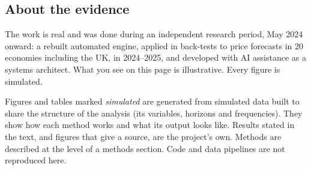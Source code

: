 \documentclass[
  british,
  a4paper,
]{article}
\begin{document}
\subsection{About the evidence}\label{about-the-evidence}

The work is real and was done during an independent research period, May
2024 onward: a rebuilt automated engine, applied in back-tests to price
forecasts in 20 economies including the UK, in 2024--2025, and developed
with AI assistance as a systems architect. What you see on this page is
illustrative. Every figure is simulated.

Figures and tables marked \emph{simulated} are generated from simulated
data built to share the structure of the analysis (its variables,
horizons and frequencies). They show how each method works and what its
output looks like. Results stated in the text, and figures that give a
source, are the project's own. Methods are described at the level of a
methods section. Code and data pipelines are not reproduced here.
\end{document}
